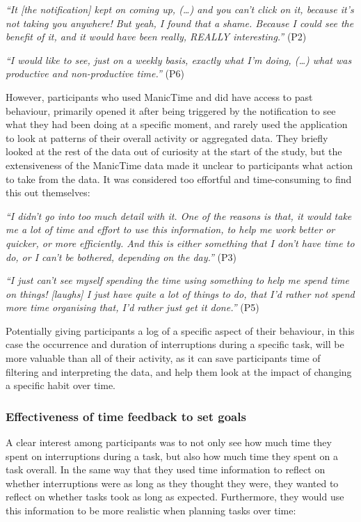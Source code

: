 \textit{“It [the notification] kept on coming up, (…) and you can't click on it, because it's not taking you anywhere! But yeah, I found that a shame. Because I could see the benefit of it, and it would have been really, REALLY interesting.”} (P2)

\textit{“I would like to see, just on a weekly basis, exactly what I’m doing, (…)  what was productive and non-productive time.”} (P6)

However, participants who used ManicTime and did have access to past behaviour, primarily opened it after being triggered by the notification to see what they had been doing at a specific moment, and rarely used the application to look at patterns of their overall activity or aggregated data. They briefly looked at the rest of the data out of curiosity at the start of the study, but the extensiveness of the ManicTime data made it unclear to participants what action to take from the data. It was considered too effortful and time-consuming to find this out themselves:

\textit{“I didn’t go into too much detail with it. One of the reasons is that, it would take me a lot of time and effort to use this information, to help me work better or quicker, or more efficiently. And this is either something that I don’t have time to do, or I can’t be bothered, depending on the day.”} (P3)

\textit{“I just can't see myself spending the time using something to help me spend time on things! [laughs] I just have quite a lot of things to do, that I’d rather not spend more time organising that, I’d rather just get it done.”} (P5)

Potentially giving participants a log of a specific aspect of their behaviour, in this case the occurrence and duration of interruptions during a specific task, will be more valuable than all of their activity, as it can save participants time of filtering and interpreting the data, and help them look at the impact of changing a specific habit over time. 

\subsubsection{Effectiveness of time feedback to set goals}
A clear interest among participants was to not only see how much time they spent on interruptions during a task, but also how much time they spent on a task overall. In the same way that they used time information to reflect on whether interruptions were as long as they thought they were, they wanted to reflect on whether tasks took as long as expected. Furthermore, they would use this information to be more realistic when planning tasks over time: 

